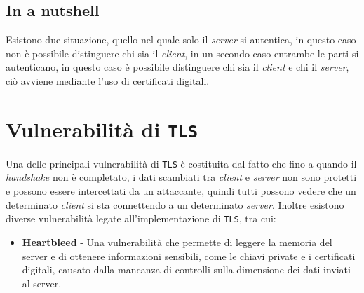     \subsection{In a nutshell}
        Esistono due situazione, quello nel quale solo il \textit{server} si autentica, in questo caso non è possibile distinguere chi sia il \textit{client}, in un secondo caso entrambe le parti si autenticano, in questo caso è possibile distinguere chi sia il \textit{client} e chi il \textit{server}, ciò avviene mediante l'uso di certificati digitali. 
\section{Vulnerabilità di \texttt{TLS}}
    Una delle principali vulnerabilità di \texttt{TLS} è costituita dal fatto che fino a quando il \textit{handshake} non è completato, i dati scambiati tra \textit{client} e \textit{server} non sono protetti e possono essere intercettati da un attaccante, quindi tutti possono vedere che un determinato \textit{client} si sta connettendo a un determinato \textit{server}. Inoltre esistono diverse vulnerabilità legate all'implementazione di \texttt{TLS}, tra cui: \begin{itemize}
        \item \textbf{Heartbleed} - Una vulnerabilità che permette di leggere la memoria del server e di ottenere informazioni sensibili, come le chiavi private e i certificati digitali, causato dalla mancanza di controlli sulla dimensione dei dati inviati al server.
    \end{itemize}